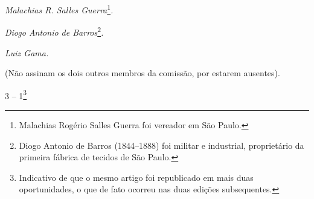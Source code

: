 \emph{Malachias R. Salles Guerra}\footnote{ Malachias Rogério Salles
  Guerra foi vereador em São Paulo.}\emph{.}

\emph{Diogo Antonio de Barros}\footnote{ Diogo Antonio de Barros
  (1844--1888) foi militar e industrial, proprietário da primeira fábrica
  de tecidos de São Paulo.}\emph{.}

\emph{Luiz Gama.}

(Não assinam os dois outros membros da comissão, por estarem ausentes).

3 -- 1\footnote{ Indicativo de que o mesmo artigo foi republicado em
  mais duas oportunidades, o que de fato ocorreu nas duas edições
  subsequentes.}

%
